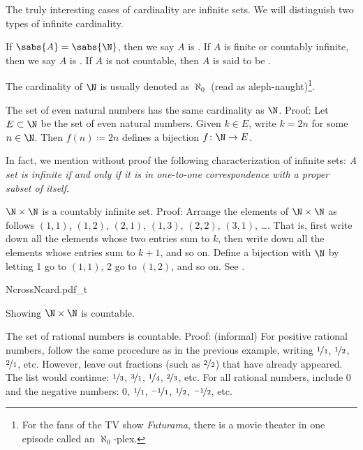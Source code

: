 The truly interesting cases of cardinality are infinite sets.
We will distinguish two types of infinite cardinality.

\begin{defn}
If $\sabs{A} = \sabs{\N}$, then we say $A$ is
\emph{}.
If $A$ is finite or countably infinite, then we say $A$
is \emph{}.
If $A$ is not countable, then
$A$ is said to be \emph{}.
\end{defn}

The cardinality of $\N$ is usually denoted as
$\aleph_0$ (read as aleph-naught)\footnote{For the fans of the TV show
\emph{Futurama}, there is a movie theater in one episode
called an $\aleph_0$-plex.}.

\begin{example}
The set of even natural numbers has the same cardinality as $\N$.  Proof:
Let $E \subset \N$ be the set of even natural numbers.
Given $k \in E$, write $k=2n$ for some $n \in \N$.
Then $f(n) \coloneqq 2n$ defines a bijection $f \colon \N \to E$.
\end{example}

In fact, we mention without proof the following characterization
of infinite sets: \emph{A set is infinite if and only if it is in one-to-one
correspondence with a proper subset of itself}.

\begin{example}
$\N \times \N$ is a countably infinite set.  Proof: Arrange the
elements of $\N \times \N$ as follows
$(1,1)$, $(1,2)$, $(2,1)$, $(1,3)$, $(2,2)$, $(3,1)$, \ldots.  That is,
first write down all the elements whose two entries sum to $k$,
then write down all the elements whose entries sum to $k+1$, and so on.
Define a bijection with $\N$ by letting 1 go to $(1,1)$,
2 go to $(1,2)$, and so on.  See .
\begin{myfigureht}
{NcrossNcard.pdf_t}
\caption{Showing $\N \times \N$ is countable.\label{fig:NcrossNcard}}
\end{myfigureht}
\end{example}

\begin{example}
The set of rational numbers is countable.  Proof: (informal)
For positive rational numbers, follow the same procedure
as in the previous example, writing
$\nicefrac{1}{1}$, $\nicefrac{1}{2}$, $\nicefrac{2}{1}$, etc.  However,
leave out fractions (such as $\nicefrac{2}{2}$)
that have already appeared.  The list would continue:
$\nicefrac{1}{3}$, $\nicefrac{3}{1}$, $\nicefrac{1}{4}$,
$\nicefrac{2}{3}$, etc.
For all rational numbers, include $0$ and the negative numbers:
$0$,
$\nicefrac{1}{1}$,
$\nicefrac{-1}{1}$,
$\nicefrac{1}{2}$,
$\nicefrac{-1}{2}$, etc.
\end{example}

